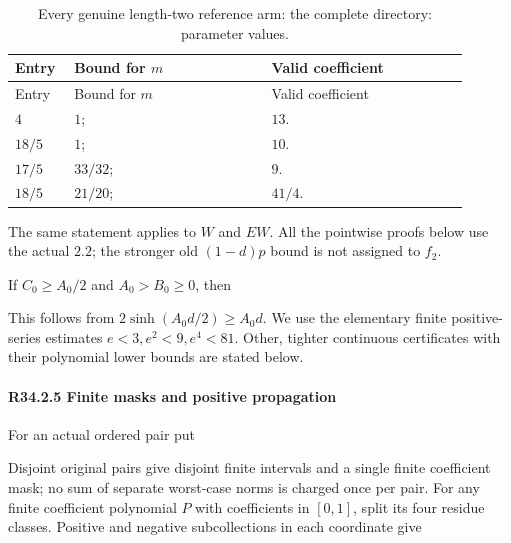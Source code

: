 \begingroup\small
\setlength{\tabcolsep}{3pt}
\setlength{\LTleft}{0pt}\setlength{\LTright}{\fill}
\begin{longtable}{@{}p{0.1200\linewidth}p{0.4000\linewidth}p{0.4000\linewidth}@{}}
\caption{Every genuine length-two reference arm: the complete directory: parameter values.}\label{tab:parameters:r2-c034:2}\\
\toprule
Entry & Bound for \(m\) & Valid coefficient \\
\midrule\endfirsthead
\toprule
Entry & Bound for \(m\) & Valid coefficient \\
\midrule\endhead
\bottomrule\endfoot
\(4\) & \(1\); & \(13\). \\
\addlinespace[2pt]
\(18/5\) & \(1\); & \(10\). \\
\addlinespace[2pt]
\(17/5\) & \(33/32\); & \(9\). \\
\addlinespace[2pt]
\(18/5\) & \(21/20\); & \(41/4\). \\
\end{longtable}
\endgroup


The same statement applies to \(W\) and \(EW\). All the pointwise proofs
below use the actual \(2.2\); the stronger old \((1-d)p\) bound is not assigned to \(f_2\).

If \(C_0\ge A_0/2\) and \(A_0>B_0\ge0\), then


This follows from \(2\sinh(A_0d/2)\ge A_0d\). We use the elementary
finite positive-series estimates \(e<3,\allowbreak  e^2<9,\allowbreak  e^4<81\).
Other, tighter continuous certificates with their polynomial lower bounds are stated below.

\paragraph{R34.2.5 Finite masks and positive propagation}

For an actual ordered pair put


Disjoint original pairs give disjoint finite intervals and a single
finite coefficient mask; no sum of separate worst-case norms is charged
once per pair. For any finite coefficient polynomial \(P\) with coefficients
in \([0,\allowbreak  1]\), split its four residue classes. Positive and negative
subcollections in each coordinate give


